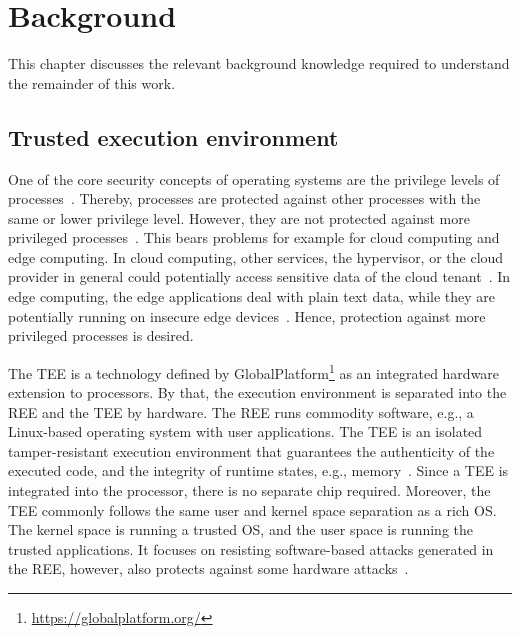 
\chapter{Background}\label{chapter:background}

This chapter discusses the relevant background knowledge required to understand the remainder of this work.

\section{Trusted execution environment}


One of the core security concepts of operating systems are the privilege levels of processes~\cite{Linden1976}. Thereby, processes are protected against other processes with the same or lower privilege level. However, they are not protected against more privileged processes~\cite{Bratus2009}. This bears problems for example for cloud computing and edge computing. In cloud computing, other services, the hypervisor, or the cloud provider in general could potentially access sensitive data of the cloud tenant~\cite{Nimgaonkar2012}. In edge computing, the edge applications deal with plain text data, while they are potentially running on insecure edge devices~\cite{Ning2018}. Hence, protection against more privileged processes is desired.



The \acf{TEE} is a technology defined by GlobalPlatform\footnote{\url{https://globalplatform.org/}} as an integrated hardware extension to processors. By that, the execution environment is separated into the \ac{REE} and the \ac{TEE} by hardware.
The \ac{REE} runs commodity software, e.g., a Linux-based operating system with user applications.
The TEE is an isolated tamper-resistant execution environment that guarantees the authenticity of the executed code, and the integrity of runtime states, e.g., memory~\cite{Sabt2015}.
Since a \ac{TEE} is integrated into the processor, there is no separate chip required.
Moreover, the \ac{TEE} commonly follows the same user and kernel space separation as a rich OS\@. The kernel space is running a trusted OS, and the user space is running the trusted applications. 
It focuses on resisting software-based attacks generated in the \ac{REE}, however, also protects against some hardware attacks~\cite{GPSysArch}.


